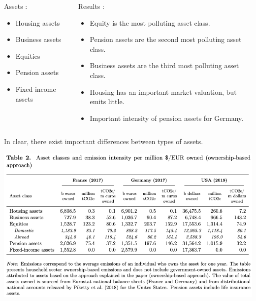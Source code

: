 \documentclass[10pt]{beamer}
\newcommand\ReduceFont{\fontsize{10}{7.2}\selectfont}
\begin{document}
\begin{frame}{\subsecname}
    \begin{columns}
        \begin{column}{0.5\textwidth}
            Assets :
                \begin{itemize} 
                    \item Housing assets
                    \item Business assets
                    \item Equities 
                    \item Pension assets
                    \item Fixed income assets
                \end{itemize}
        \end{column}
        \begin{column}{0.5\textwidth}
            \ReduceFont
            Results : 
                \begin{itemize}
                    \item Equity is the most polluting asset class.
                    \item Pension assets are the second most polluting asset class.
                    \item Business assets are the third most polluting asset class.
                    \item Housing has an important market valuation, but emits little.
                    \item Important intensity of pension assets for Germany.
                \end{itemize}    
        \end{column}
    \end{columns}
    \hfill \break
    In clear, there exist important differences between types of assets.
\end{frame}

\begin{frame}{\subsecname}
    \begin{center}
        \includegraphics[width=\textwidth]{../Figures/T2.png}    
    \end{center}
\end{frame}
\end{document}

